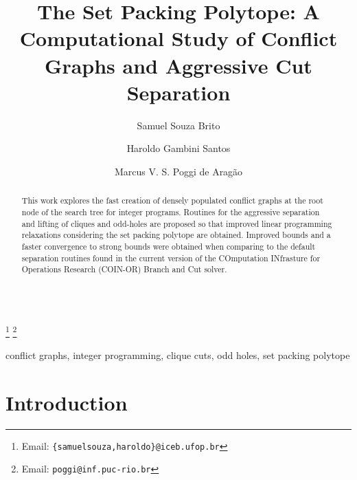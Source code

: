 \documentclass{endm}
\begin{document}
  

\begin{verbatim}\end{verbatim}\vspace{2.5cm}

\begin{frontmatter}

\title{The Set Packing Polytope: A Computational Study of Conflict Graphs and Aggressive Cut Separation}
\author{Samuel Souza Brito \and Haroldo Gambini Santos}
\address{{\scriptsize Departamento de Computação, Universidade Federal de Ouro Preto - UFOP\\ Ouro Preto, Brazil}}
\author{Marcus V. S. Poggi de Aragão}
\address{{\scriptsize Dep. de Informática, Pontifícia Universidade Católica do Rio de Janeiro - PUC-RIO\\ Rio de Janeiro, Brazil}}
\thanks[mailSamuelHaroldo]{Email: {\texttt{\normalshape \{samuelsouza,haroldo\}@iceb.ufop.br}}} 
\thanks[mailPoggi]{Email: {\texttt{\normalshape poggi@inf.puc-rio.br}}}  

\begin{abstract}
This work explores the fast creation of densely populated conflict graphs at the root node of the search tree for integer programs. Routines for the aggressive separation and lifting of cliques and odd-holes are proposed so that improved linear programming relaxations considering the set packing polytope are obtained. Improved bounds and a faster convergence to strong bounds were obtained when comparing to the default separation routines found in the current version of the COmputation INfrasture for Operations Research (COIN-OR) Branch and Cut solver.
\end{abstract}

\begin{keyword}
conflict graphs, integer programming, clique cuts, odd holes, set packing polytope
\end{keyword}

\end{frontmatter}


\section{Introduction}\label{intro}
\end{document}
